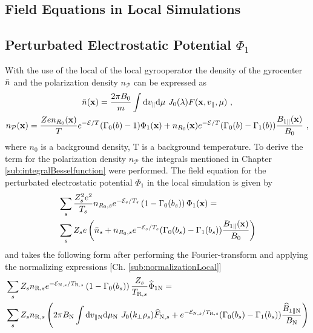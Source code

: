 \subsection{Field Equations in Local Simulations}
\label{sub:fieldLocal}

\subsection*{Perturbated Electrostatic Potential $\Phi_1$}
\label{sub:fieldPotentialLocal}

With the use of the local of the local gyrooperator the density of the gyrocenter $\bar{n}$ and the polarization density $n_\mathcal{P}$ can be expressed as
\begin{gather}
	\bar{n}(\boldsymbol{\mathbf{x}}) = \frac{2\pi B_0}{m} \int \mathrm{d}v_\parallel\mathrm{d}\mu ~ J_0(\lambda) F(\boldsymbol{\mathbf{x}}, v_\parallel, \mu)~, \\
	n_\mathcal{P}(\boldsymbol{\mathbf{x}}) = \frac{Ze n_{R_0}(\boldsymbol{\mathbf{x}})}{T} e^{-\mathcal{E}/T} (\Gamma_0(b) - 1) \Phi_1(\boldsymbol{\mathbf{x}}) + n_{R_0}(\boldsymbol{\mathbf{x}}) e^{-\mathcal{E}/T} (\Gamma_0(b) - \Gamma_1(b))\frac{B_{1\parallel}(\boldsymbol{\mathbf{x}})}{B_0}~,
	\label{eq:particleDensityLocal}
\end{gather}
where $n_0$ is a background density, T is a background temperature. To derive the term for the polarization density $n_\mathcal{P}$ the integrals mentioned in Chapter \ref{sub:integralBesselfunction} were performed. The field equation for the perturbated electrostatic potential $\Phi_1$ in the local simulation is given by
\begin{gather}
    \begin{aligned}
        &\sum_s \frac{Z_s^2e^2}{T_s} n_{R_0,s} e^{-\mathcal{E}_s/T_s} \left(1 - \Gamma_0(b_s)\right) \Phi_1(\boldsymbol{\mathbf{x}}) = \\
        &\sum_s Z_se \left(\bar{n}_s + n_{R_0,s} e^{-\mathcal{E}_s/T_s} (\Gamma_0(b_s) - \Gamma_1(b_s))\frac{B_{1\parallel}(\boldsymbol{\mathbf{x}})}{B_0} \right)
        \label{eq:fieldPotentialLocal}
    \end{aligned}
\end{gather}
and takes the following form after performing the Fourier-transform and applying the normalizing expressions [Ch. \ref{sub:normalizationLocal}]
\begin{gather}
    \begin{aligned}
        &\sum_s Z_s n_{\mathrm{R},s} e^{-\mathcal{E}_{\mathrm{N},s}/T_{\mathrm{R},s}} \left(1 - \Gamma_0(b_s)\right) \frac{Z_s}{T_{\mathrm{R},s}} \widehat{\Phi}_{1 \mathrm{N}} = \\
        &\sum_s Z_sn_{\mathrm{R},s} \left(2\pi B_\mathrm{N} \int \mathrm{d}v_{\parallel \mathrm{N}} \mathrm{d}\mu_\mathrm{N} ~ J_0(k_\perp \rho_s) \widehat{F}_{\mathrm{N},s} + e^{-\mathcal{E}_{\mathrm{N},s}/T_{\mathrm{R},s}} (\Gamma_0(b_s) - \Gamma_1(b_s))\frac{\widehat{B}_{1\parallel \mathrm{N}}}{B_\mathrm{N}} \right)
        \label{eq:fieldPotentialLocalNorm}
    \end{aligned}
\end{gather}


